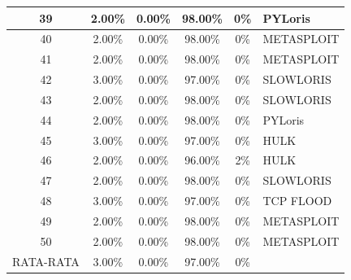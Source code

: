 \begin{table}[H]
\begin{tabular}{|c|c|c|c|c|l|}
		39        & 2.00\%   & 0.00\%                                                 & 98.00\% & 0\%    & PYLoris    \\ \hline
		40        & 2.00\%   & 0.00\%                                                 & 98.00\% & 0\%    & METASPLOIT \\ \hline
		41        & 2.00\%   & 0.00\%                                                 & 98.00\% & 0\%    & METASPLOIT \\ \hline
		42        & 3.00\%   & 0.00\%                                                 & 97.00\% & 0\%    & SLOWLORIS  \\ \hline
		43        & 2.00\%   & 0.00\%                                                 & 98.00\% & 0\%    & SLOWLORIS  \\ \hline
		44        & 2.00\%   & 0.00\%                                                 & 98.00\% & 0\%    & PYLoris    \\ \hline
		45        & 3.00\%   & 0.00\%                                                 & 97.00\% & 0\%    & HULK       \\ \hline
		46        & 2.00\%   & 0.00\%                                                 & 96.00\% & 2\%    & HULK       \\ \hline
		47        & 2.00\%   & 0.00\%                                                 & 98.00\% & 0\%    & SLOWLORIS  \\ \hline
		48        & 3.00\%   & 0.00\%                                                 & 97.00\% & 0\%    & TCP FLOOD  \\ \hline
		49        & 2.00\%   & 0.00\%                                                 & 98.00\% & 0\%    & METASPLOIT \\ \hline
		50        & 2.00\%   & 0.00\%                                                 & 98.00\% & 0\%    & METASPLOIT \\ \hline
		RATA-RATA & 3.00\%   & 0.00\%                                                 & 97.00\% & 0\%    &            \\ \hline
	\end{tabular}
\end{table}





